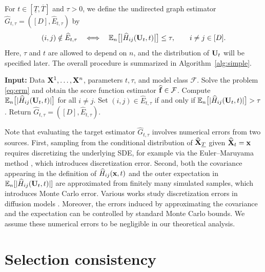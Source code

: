 \documentclass[11pt,a4paper,final]{article}
\numberwithin{equation}{section}
\theoremstyle{remark}
\def\cF{\mathcal F}
\newcommand{\bff}{{\bf f}}
\newcommand{\bU}{{\bf U}}
\newcommand{\bx}{{\bf x}}
\newcommand{\bX}{{\bf X}}
\newcommand{\bbE}{{\mathbb E}}
\newcommand{\be}{\begin{equation}}
\newcommand{\ee}{\end{equation}}
\begin{document}
For $t \in [\underline{T}, \overline{T}]$ and $ \tau > 0$, we define the undirected graph estimator $\widehat G_{t, \tau} = ([D], \widehat E_{t, \tau})$ by
\be
(i,j) \notin \widehat E_{t,\tau}
\quad\Longleftrightarrow\quad 
\bbE_{n} \big[ \big| \widehat H_{ij}(\bU_{t}, t) \big| \big] \leq \tau,
\qquad i \neq j \in [D].
\label{eq:estimator}
\ee
Here, $\tau$ and $t$ are allowed to depend on $n$, and the distribution of $\bU_t$ will be specified later.
The overall procedure is summarized in Algorithm~\ref{alg:simple}.


\begin{algorithm}[!t]
\caption{Diffusion-based graph estimation}
\label{alg:simple}
\begin{algorithmic}[1]
\State \textbf{Input:} Data $\bX^1,\ldots,\bX^n$, parameters $t,\tau$, and model class $\cF$.
\State Solve the problem \eqref{eq:erm} and obtain the score function estimator $\widehat \bff \in \cF$.
\State Compute $\bbE_n\big[|\widehat H_{ij}(\bU_{t},t)|\big]$ for all $i \neq j$.
\State Set $(i,j) \in \widehat E_{t,\tau}$ if and only if $\bbE_n\big[|\widehat H_{ij}(\bU_{t},t)|\big] > \tau$.
\State Return $\widehat G_{t,\tau} = ([D],\widehat E_{t,\tau})$.
\end{algorithmic}
\end{algorithm}

Note that evaluating the target estimator $\widehat G_{t,\tau}$ involves numerical errors from two sources.
First, sampling from the conditional distribution of $\widehat \bX_{\underline{T}}$ given $\widehat \bX_t=\bx$ requires discretizing the underlying SDE, for example via the Euler--Maruyama method \citep{kloeden2011numerical, song2021scorebased}, which introduces discretization error.
Second, both the covariance appearing in the definition of $\widehat H_{ij}(\bx,t)$ and the outer expectation in $\bbE_{n} [ | \widehat H_{ij}(\bU_{t}, t) | ]$ are approximated from finitely many simulated samples, which introduces Monte Carlo error.
Various works study discretization errors in diffusion models \citep{oko2023diffusion, benton2024nearly, chen2023sampling}.
Moreover, the errors induced by approximating the covariance and the expectation can be controlled by standard Monte Carlo bounds.
We assume these numerical errors to be negligible in our theoretical analysis.


\section{Selection consistency}
\label{sec:consistency}
\end{document}
